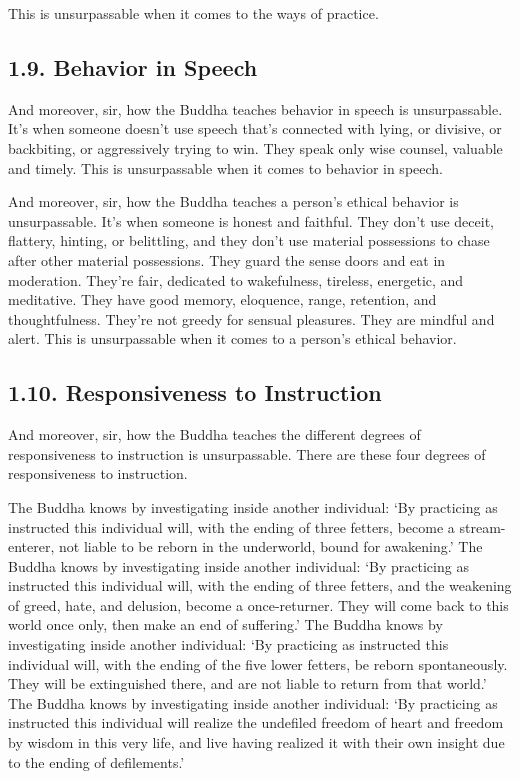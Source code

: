 \documentclass[12pt,openany]{book}%
\begin{document}
This is unsurpassable when it comes to the ways of practice. 

\subsection*{1.9. Behavior in Speech }

And moreover, sir, how the Buddha teaches behavior in speech is unsurpassable. It’s when someone doesn’t use speech that’s connected with lying, or divisive, or backbiting, or aggressively trying to win. They speak only wise counsel, valuable and timely. This is unsurpassable when it comes to behavior in speech. 

And moreover, sir, how the Buddha teaches a person’s ethical behavior is unsurpassable. It’s when someone is honest and faithful. They don’t use deceit, flattery, hinting, or belittling, and they don’t use material possessions to chase after other material possessions. They guard the sense doors and eat in moderation. They’re fair, dedicated to wakefulness, tireless, energetic, and meditative. They have good memory, eloquence, range, retention, and thoughtfulness. They’re not greedy for sensual pleasures. They are mindful and alert. This is unsurpassable when it comes to a person’s ethical behavior. 

\subsection*{1.10. Responsiveness to Instruction }

And moreover, sir, how the Buddha teaches the different degrees of responsiveness to instruction is unsurpassable. There are these four degrees of responsiveness to instruction. 

The Buddha knows by investigating inside another individual: ‘By practicing as instructed this individual will, with the ending of three fetters, become a stream-enterer, not liable to be reborn in the underworld, bound for awakening.’ The Buddha knows by investigating inside another individual: ‘By practicing as instructed this individual will, with the ending of three fetters, and the weakening of greed, hate, and delusion, become a once-returner. They will come back to this world once only, then make an end of suffering.’ The Buddha knows by investigating inside another individual: ‘By practicing as instructed this individual will, with the ending of the five lower fetters, be reborn spontaneously. They will be extinguished there, and are not liable to return from that world.’ The Buddha knows by investigating inside another individual: ‘By practicing as instructed this individual will realize the undefiled freedom of heart and freedom by wisdom in this very life, and live having realized it with their own insight due to the ending of defilements.’ 
\end{document}

